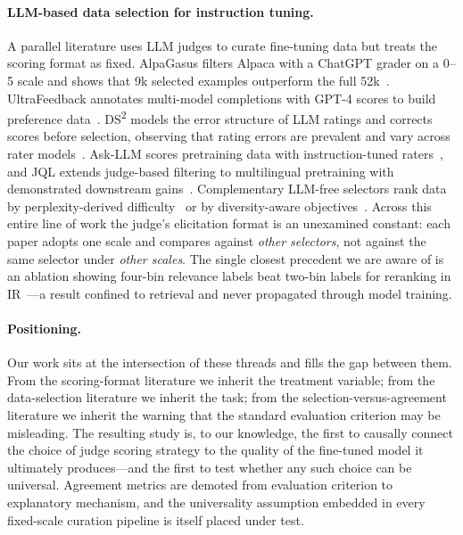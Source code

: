 \paragraph{LLM-based data selection for instruction tuning.}
A parallel literature uses LLM judges to curate fine-tuning data but
treats the scoring format as fixed. AlpaGasus filters Alpaca with a
ChatGPT grader on a 0--5 scale and shows that 9k selected examples
outperform the full 52k~\citep{chen2024alpagasus}. UltraFeedback annotates
multi-model completions with GPT-4 scores to build preference
data~\citep{cui2023ultrafeedback}. DS\textsuperscript{2} models the error
structure of LLM ratings and corrects scores before selection, observing
that rating errors are prevalent and vary across rater
models~\citep{pang2025ds2}. Ask-LLM scores pretraining data with
instruction-tuned raters~\citep{sachdeva2024askllm}, and JQL extends
judge-based filtering to multilingual pretraining with demonstrated
downstream gains~\citep{ali2025jql}. Complementary LLM-free selectors rank
data by perplexity-derived difficulty~\citep{li2024ifd,
li2024superfiltering} or by diversity-aware
objectives~\citep{bukharin2024diversity}. Across this entire line of work
the judge's elicitation format is an unexamined constant: each paper
adopts one scale and compares against \emph{other selectors}, not against
the same selector under \emph{other scales}. The single closest precedent
we are aware of is an ablation showing four-bin relevance labels beat
two-bin labels for reranking in IR~\citep{zhuang2024beyond}---a result
confined to retrieval and never propagated through model training.

\paragraph{Positioning.}
Our work sits at the intersection of these threads and fills the gap
between them. From the scoring-format literature we inherit the treatment
variable; from the data-selection literature we inherit the task; from the
selection-versus-agreement literature we inherit the warning that the
standard evaluation criterion may be misleading. The resulting study is,
to our knowledge, the first to causally connect the choice of judge
scoring strategy to the quality of the fine-tuned model it ultimately
produces---and the first to test whether any such choice can be universal.
Agreement metrics are demoted from evaluation criterion to explanatory
mechanism, and the universality assumption embedded in every fixed-scale
curation pipeline is itself placed under test.


